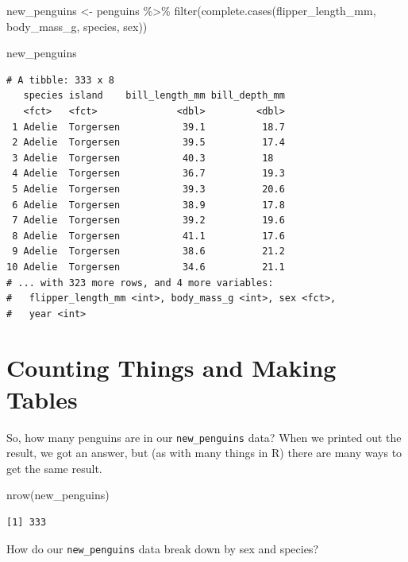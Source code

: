 \documentclass[
]{book}
\newenvironment{Shaded}{\begin{snugshade}}{\end{snugshade}}
\newcommand{\FunctionTok}[1]{\textcolor[rgb]{0.00,0.00,0.00}{#1}}
\newcommand{\NormalTok}[1]{#1}
\newcommand{\OtherTok}[1]{\textcolor[rgb]{0.56,0.35,0.01}{#1}}
\newcommand{\SpecialCharTok}[1]{\textcolor[rgb]{0.00,0.00,0.00}{#1}}
\begin{document}
\begin{Shaded}
\begin{Highlighting}[]
\NormalTok{new\_penguins }\OtherTok{\textless{}{-}}\NormalTok{ penguins }\SpecialCharTok{\%\textgreater{}\%}
    \FunctionTok{filter}\NormalTok{(}\FunctionTok{complete.cases}\NormalTok{(flipper\_length\_mm, body\_mass\_g, species, sex))}

\NormalTok{new\_penguins}
\end{Highlighting}
\end{Shaded}

\begin{verbatim}
# A tibble: 333 x 8
   species island    bill_length_mm bill_depth_mm
   <fct>   <fct>              <dbl>         <dbl>
 1 Adelie  Torgersen           39.1          18.7
 2 Adelie  Torgersen           39.5          17.4
 3 Adelie  Torgersen           40.3          18  
 4 Adelie  Torgersen           36.7          19.3
 5 Adelie  Torgersen           39.3          20.6
 6 Adelie  Torgersen           38.9          17.8
 7 Adelie  Torgersen           39.2          19.6
 8 Adelie  Torgersen           41.1          17.6
 9 Adelie  Torgersen           38.6          21.2
10 Adelie  Torgersen           34.6          21.1
# ... with 323 more rows, and 4 more variables:
#   flipper_length_mm <int>, body_mass_g <int>, sex <fct>,
#   year <int>
\end{verbatim}

\hypertarget{counting-things-and-making-tables}{%
\section{Counting Things and Making Tables}\label{counting-things-and-making-tables}}

So, how many penguins are in our \texttt{new\_penguins} data? When we printed out the result, we got an answer, but (as with many things in R) there are many ways to get the same result.

\begin{Shaded}
\begin{Highlighting}[]
\FunctionTok{nrow}\NormalTok{(new\_penguins)}
\end{Highlighting}
\end{Shaded}

\begin{verbatim}
[1] 333
\end{verbatim}

How do our \texttt{new\_penguins} data break down by sex and species?
\end{document}
